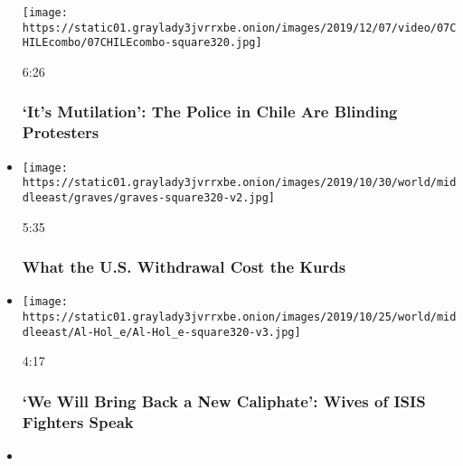 \begin{itemize}
  \texttt{[image: https://static01.graylady3jvrrxbe.onion/images/2019/12/07/video/07CHILEcombo/07CHILEcombo-square320.jpg]}

  6:26

  \hypertarget{its-mutilation-the-police-in-chile-are-blinding-protesters}{%
  \subsubsection{`It's Mutilation': The Police in Chile Are Blinding
  Protesters}\label{its-mutilation-the-police-in-chile-are-blinding-protesters}}
\item
  \href{https://www.nytimes3xbfgragh.onion/video/world/middleeast/100000006789926/us-kurds.html?action=click\&module=video-series-bar\&region=header\&pgtype=Article\&playlistId=video/on-the-ground}{}

  \texttt{[image: https://static01.graylady3jvrrxbe.onion/images/2019/10/30/world/middleeast/graves/graves-square320-v2.jpg]}

  5:35

  \hypertarget{what-the-us-withdrawal-cost-the-kurds}{%
  \subsubsection{What the U.S. Withdrawal Cost the
  Kurds}\label{what-the-us-withdrawal-cost-the-kurds}}
\item
  \href{https://www.nytimes3xbfgragh.onion/video/world/middleeast/100000006777985/syria-isis-alhol-turkey-kurds.html?action=click\&module=video-series-bar\&region=header\&pgtype=Article\&playlistId=video/on-the-ground}{}

  \texttt{[image: https://static01.graylady3jvrrxbe.onion/images/2019/10/25/world/middleeast/Al-Hol\_e/Al-Hol\_e-square320-v3.jpg]}

  4:17

  \hypertarget{we-will-bring-back-a-new-caliphate-wives-of-isis-fighters-speak}{%
  \subsubsection{`We Will Bring Back a New Caliphate': Wives of ISIS
  Fighters
  Speak}\label{we-will-bring-back-a-new-caliphate-wives-of-isis-fighters-speak}}
\item
  \href{https://www.nytimes3xbfgragh.onion/video/world/middleeast/100000006757197/turkey-syria-invasion.html?action=click\&module=video-series-bar\&region=header\&pgtype=Article\&playlistId=video/on-the-ground}{}


\end{itemize}
